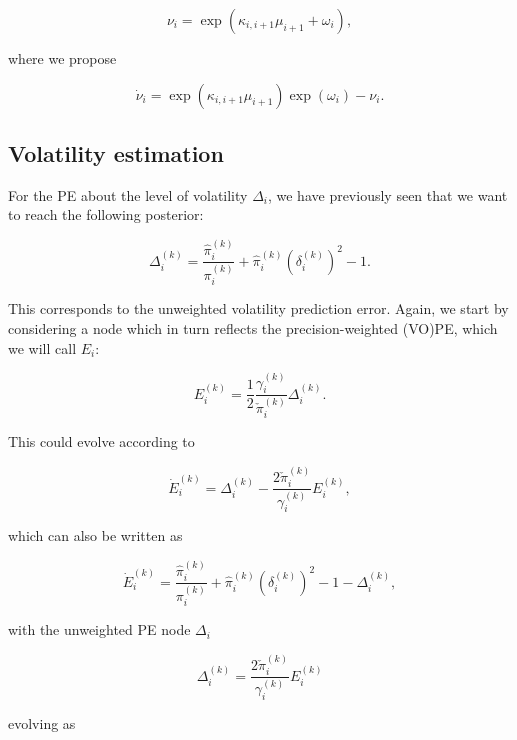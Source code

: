 \begin{equation}
  \nu_i = \exp(\kappa_{i,i+1} \mu_{i+1} + \omega_i),
\end{equation}

where we propose

\begin{equation}
  \dot{\nu}_i = \exp(\kappa_{i,i+1} \mu_{i+1}) \exp(\omega_i) - \nu_i.
\end{equation}


\subsection{Volatility estimation}

For the \textsf{PE} about the level of volatility $\Delta_i$, we have previously seen that we want to reach the following posterior:

\begin{equation}
	\Delta_i^{(k)} = \frac{\hat{\pi}_i^{(k)}}{\pi_{i}^{(k)}} + \hat{\pi}_i^{(k)} (\delta_i^{(k)})^2 - 1.
\end{equation}

This corresponds to the unweighted volatility prediction error. Again, we start by considering a node which in turn reflects the precision-weighted (VO)PE, which we will call $E_i$:

\begin{equation}
	E_i^{(k)} = \frac{1}{2} \frac{\gamma_i^{(k)}}{\check{\pi}_i^{(k)}} \Delta_i^{(k)}.
\end{equation}

This could evolve according to 

\begin{equation}
	\dot{E}_i^{(k)} = \Delta_i^{(k)} - \frac{2 \check{\pi}_i^{(k)}}{\gamma_i^{(k)}} E_i^{(k)},
\end{equation}

which can also be written as 

\begin{equation}
	\dot{E}_i^{(k)} = \frac{\hat{\pi}_i^{(k)}}{\pi_{i}^{(k)}} + \hat{\pi}_i^{(k)} (\delta_i^{(k)})^2 - 1 - \Delta_i^{(k)},
\end{equation}

with the unweighted PE node $\Delta_i$

\begin{equation}
	\Delta_i^{(k)} = \frac{2 \check{\pi}_i^{(k)}}{\gamma_i^{(k)}} E_i^{(k)}
\end{equation}

evolving as 

